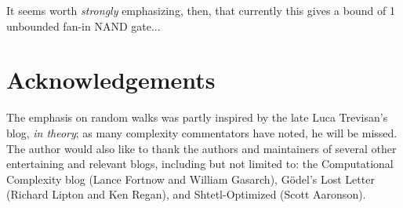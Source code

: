 \documentclass[12pt]{article}
\theoremstyle{definition}
\begin{document}
It seems worth {\em strongly} emphasizing, then, that currently this gives a bound
of 1 unbounded fan-in NAND gate...

\section{Acknowledgements}

The emphasis on random walks was partly inspired by the late Luca Trevisan's
blog, {\em in theory};
as many complexity commentators have noted, he will be missed.
The author would also like to thank the authors and maintainers of
several other entertaining and relevant blogs, including but
not limited to: the Computational Complexity blog
(Lance Fortnow and William Gasarch),
G\"odel's Lost Letter (Richard Lipton and Ken Regan),
and Shtetl-Optimized (Scott Aaronson).



\end{document}
